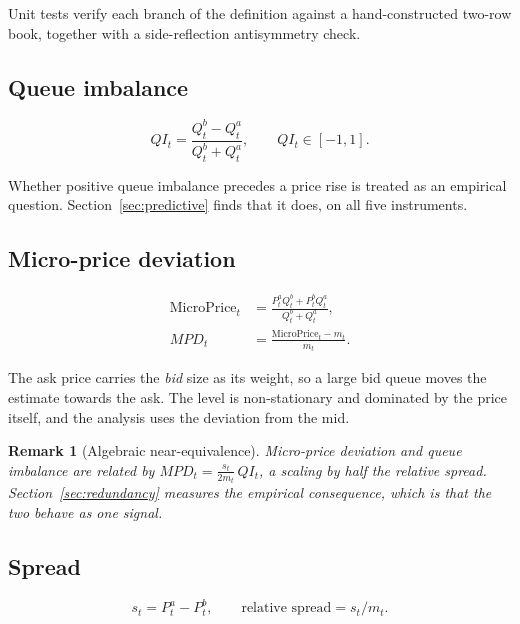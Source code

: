 \documentclass[11pt]{scrartcl}
\newtheorem{remark}{Remark}[section]
\begin{document}
Unit tests verify each branch of the definition against a hand-constructed two-row book, together with a side-reflection antisymmetry check.

\subsection{Queue imbalance}
\label{sec:qi}

\begin{equation}
QI_t = \frac{Q^b_t - Q^a_t}{Q^b_t + Q^a_t}, \qquad QI_t \in [-1, 1].
\label{eq:qi}
\end{equation}

Whether positive queue imbalance precedes a price rise is treated as an empirical question. Section~\ref{sec:predictive} finds that it does, on all five instruments.

\subsection{Micro-price deviation}
\label{sec:mpd}

\begin{align}
\mathrm{MicroPrice}_t &= \frac{P^a_t Q^b_t + P^b_t Q^a_t}{Q^b_t + Q^a_t}, \label{eq:micro}\\[4pt]
MPD_t &= \frac{\mathrm{MicroPrice}_t - m_t}{m_t}. \label{eq:mpd}
\end{align}

The ask price carries the \emph{bid} size as its weight, so a large bid queue moves the estimate towards the ask. The level is non-stationary and dominated by the price itself, and the analysis uses the deviation from the mid.

\begin{remark}[Algebraic near-equivalence]
\label{rem:algebra}
Micro-price deviation and queue imbalance are related by $MPD_t = \frac{s_t}{2 m_t}\, QI_t$, a scaling by half the relative spread. Section~\ref{sec:redundancy} measures the empirical consequence, which is that the two behave as one signal.
\end{remark}

\subsection{Spread}
\label{sec:spread}

\begin{equation}
s_t = P^a_t - P^b_t, \qquad \text{relative spread} = s_t / m_t.
\label{eq:spread}
\end{equation}
\end{document}

